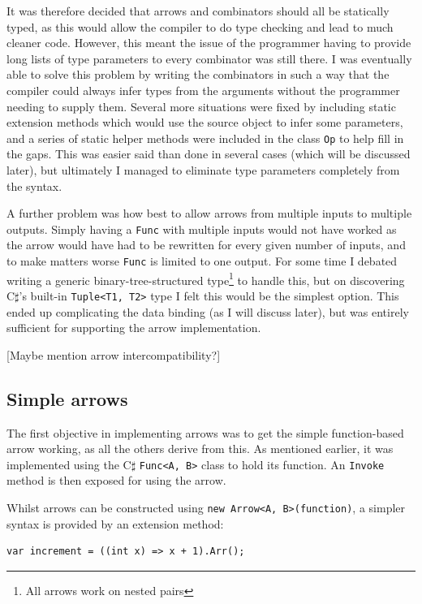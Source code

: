\documentclass[12pt,twoside,notitlepage]{report}
\begin{document}
It was therefore decided that arrows and combinators should all be statically typed, as this would allow the compiler to do type checking and lead to much cleaner code. However, this meant the issue of the programmer having to provide long lists of type parameters to every combinator was still there. I was eventually able to solve this problem by writing the combinators in such a way that the compiler could always infer types from the arguments without the programmer needing to supply them. Several more situations were fixed by including static extension methods which would use the source object to infer some parameters, and a series of static helper methods were included in the class \texttt{Op} to help fill in the gaps. This was easier said than done in several cases (which will be discussed later), but ultimately I managed to eliminate type parameters completely from the syntax.

A further problem was how best to allow arrows from multiple inputs to multiple outputs. Simply having a \texttt{Func} with multiple inputs would not have worked as the arrow would have had to be rewritten for every given number of inputs, and to make matters worse \texttt{Func} is limited to one output. For some time I debated writing a generic binary-tree-structured type\footnote{All arrows work on nested pairs} to handle this, but on discovering C$\sharp$'s built-in \texttt{Tuple<T1, T2>} type I felt this would be the simplest option. This ended up complicating the data binding (as I will discuss later), but was entirely sufficient for supporting the arrow implementation.

[Maybe mention arrow intercompatibility?]

\subsection{Simple arrows}

The first objective in implementing arrows was to get the simple function-based arrow working, as all the others derive from this. As mentioned earlier, it was implemented using the C$\sharp$ \texttt{Func<A, B>} class to hold its function. An \texttt{Invoke} method is then exposed for using the arrow.

Whilst arrows can be constructed using \texttt{new Arrow<A, B>(function)}, a simpler syntax is provided by an extension method:

\begin{lstlisting}[language={[Sharp]C}]
var increment = ((int x) => x + 1).Arr();
\end{lstlisting}
\end{document}
